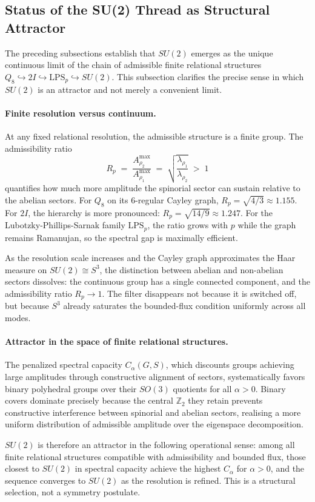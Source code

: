 \subsection{Status of the SU(2) Thread as Structural Attractor}
  \label{subsec:SU2-thread-status}

  The preceding subsections establish that $SU(2)$ emerges as the unique continuous
  limit of the chain of admissible finite relational structures
  $Q_8 \hookrightarrow 2I \hookrightarrow \mathrm{LPS}_p \hookrightarrow SU(2)$.
  This subsection clarifies the precise sense in which $SU(2)$ is an attractor and not
  merely a convenient limit.

  \paragraph{Finite resolution versus continuum.}
    At any fixed relational resolution, the admissible structure is a finite group.
    The admissibility ratio
    \begin{equation}
      R_p \;=\; \frac{A_{\rho_2}^{\max}}{A_{\rho_1}^{\max}}
      \;=\; \sqrt{\frac{\lambda_{\rho_1}}{\lambda_{\rho_2}}} \;>\; 1
    \end{equation}
    quantifies how much more amplitude the spinorial sector can sustain relative to the
    abelian sectors.
    For $Q_8$ on its 6-regular Cayley graph, $R_p = \sqrt{4/3}\approx 1.155$.
    For $2I$, the hierarchy is more pronounced: $R_p = \sqrt{14/9}\approx 1.247$.
    For the Lubotzky-Phillips-Sarnak family $\mathrm{LPS}_p$, the ratio grows with $p$
    while the graph remains Ramanujan, so the spectral gap is maximally efficient.

    As the resolution scale increases and the Cayley graph approximates the Haar measure
    on $SU(2)\cong S^3$, the distinction between abelian and non-abelian sectors dissolves:
    the continuous group has a single connected component, and the admissibility ratio
    $R_p\to 1$.
    The filter disappears not because it is switched off, but because $S^3$ already
    saturates the bounded-flux condition uniformly across all modes.

  \paragraph{Attractor in the space of finite relational structures.}
    The penalized spectral capacity $C_\alpha(G,S)$, which discounts groups achieving
    large amplitudes through constructive alignment of sectors, systematically favors
    binary polyhedral groups over their $SO(3)$ quotients for all $\alpha>0$.
    Binary covers dominate precisely because the central $\mathbb{Z}_2$ they retain
    prevents constructive interference between spinorial and abelian sectors, realising a
    more uniform distribution of admissible amplitude over the eigenspace decomposition.

    $SU(2)$ is therefore an attractor in the following operational sense: among all finite
    relational structures compatible with admissibility and bounded flux, those closest to
    $SU(2)$ in spectral capacity achieve the highest $C_\alpha$ for $\alpha>0$, and the
    sequence converges to $SU(2)$ as the resolution is refined.
    This is a structural selection, not a symmetry postulate.
